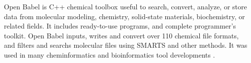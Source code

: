 Open Babel is C++ chemical toolbox useful to search, convert, analyze, or store data from molecular modeling, chemistry, solid-state materials, biochemistry, or related fields. It includes ready-to-use programs, and complete programmer's toolkit. Open Babel inputs, writes and convert over 110 chemical file formats, and filters and searchs molecular files using SMARTS and other methods. It was used in many cheminformatics and bioinformatics tool developments \cite{O_Boyle_2011}.